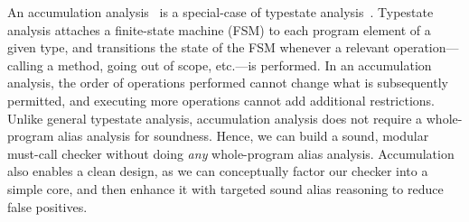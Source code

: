 An accumulation analysis~\cite{KelloggRSSE2020}
is a special-case of typestate analysis~\cite{StromY86}.
Typestate analysis attaches a finite-state machine (FSM)
to each program element of a given type, and transitions the state of the
FSM whenever a relevant operation---calling a method, going out of scope,
etc.---is performed.
In an accumulation analysis,
the order of operations performed cannot change what is subsequently
permitted, and executing more operations cannot add additional
restrictions.
Unlike general typestate analysis, accumulation analysis does not
require a whole-program alias analysis for soundness.
Hence, we can build a sound, modular must-call
checker
without doing \emph{any} whole-program alias analysis.
Accumulation also enables a clean design, as we
can conceptually factor our checker into a simple core, and
then enhance it with
targeted sound alias reasoning to reduce false positives.

